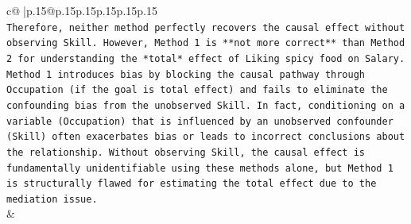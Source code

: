 \documentclass{article}
\begin{document}
{\begin{supertabular}{c@{$\;$}|p{.15\linewidth}@{}p{.15\linewidth}p{.15\linewidth}p{.15\linewidth}p{.15\linewidth}p{.15\linewidth}}
{{{\\ 
\texttt{Therefore, neither method perfectly recovers the causal effect without observing Skill. However, Method 1 is **not more correct** than Method 2 for understanding the *total* effect of Liking spicy food on Salary. Method 1 introduces bias by blocking the causal pathway through Occupation (if the goal is total effect) and fails to eliminate the confounding bias from the unobserved Skill. In fact, conditioning on a variable (Occupation) that is influenced by an unobserved confounder (Skill) often exacerbates bias or leads to incorrect conclusions about the relationship. Without observing Skill, the causal effect is fundamentally unidentifiable using these methods alone, but Method 1 is structurally flawed for estimating the total effect due to the mediation issue.} \\
            }
        }
    }
    & \\ \\


\end{supertabular}}
\end{document}
